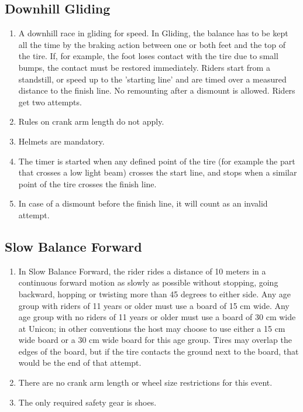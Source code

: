\subsection{Downhill Gliding}

\begin{enumerate}[leftmargin=1.5em,labelsep=*]
	\item A downhill race in gliding for speed.
	In Gliding, the balance has to be kept all the time by the braking action between one or both feet and the top of the tire.
	If, for example, the foot loses contact with the tire due to small bumps, the contact must be restored immediately.
	Riders start from a standstill, or speed up to the 'starting line' and are timed over a measured distance to the finish line.
	No remounting after a dismount is allowed. Riders get two attempts.
	
	\item Rules on crank arm length do not apply.
	
	\item Helmets are mandatory.
	
	\item The timer is started when any defined point of the tire (for example the part that crosses a low light beam) 
  crosses the start line, and stops when a similar point of the tire crosses the finish line.
	
	\item In case of a dismount before the finish line, it will count as an invalid attempt.
\end{enumerate}

\subsection{Slow Balance Forward}

\begin{enumerate}[leftmargin=1.5em,labelsep=*]
	\item In Slow Balance Forward, the rider rides a distance of 10 meters in a continuous forward motion as 
  slowly as possible without stopping, going backward, hopping or twisting more than 45 degrees to either side.
	Any age group with riders of 11 years or older must use a board of 15 cm wide.
	Any age group with no riders of 11 years or older must use a board of 30 cm wide at Unicon; in other 
  conventions the host may choose to use either a 15 cm wide board or a 30 cm wide board for this age group.
	Tires may overlap the edges of the board, but if the tire contacts the ground next to the board, that 
  would be the end of that attempt.
	
	\item There are no crank arm length or wheel size restrictions for this event.
	
	\item The only required safety gear is shoes.
\end{enumerate}

